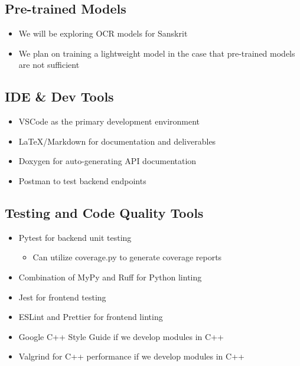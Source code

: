\documentclass{article}
\begin{document}
\subsection*{Pre-trained Models}
\begin{itemize}
    \item We will be exploring OCR models for Sanskrit
    \item We plan on training a lightweight model in the case that pre-trained models are not sufficient
\end{itemize}

\subsection*{IDE \& Dev Tools}
\begin{itemize}
    \item VSCode as the primary development environment
    \item LaTeX/Markdown for documentation and deliverables
    \item Doxygen for auto-generating API documentation
    \item Postman to test backend endpoints
\end{itemize}

\subsection*{Testing and Code Quality Tools}
\begin{itemize}
    \item Pytest for backend unit testing
    \begin{itemize}
        \item Can utilize coverage.py to generate coverage reports
    \end{itemize}
    \item Combination of MyPy and Ruff for Python linting
    \item Jest for frontend testing
    \item ESLint and Prettier for frontend linting
    \item Google C++ Style Guide if we develop modules in C++
    \item Valgrind for C++ performance if we develop modules in C++
\end{itemize}
\end{document}
